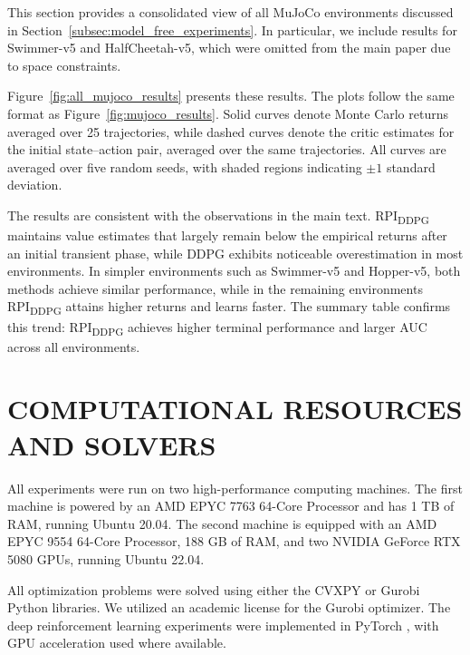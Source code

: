 \documentclass[twoside]{article}
\theoremstyle{plain}
\theoremstyle{definition}
\theoremstyle{remark}
\newcommand{\rpiddpg}{RPI\textsubscript{DDPG}}
\begin{document}
This section provides a consolidated view of all MuJoCo environments discussed in Section~\ref{subsec:model_free_experiments}. In particular, we include results for Swimmer-v5 and HalfCheetah-v5, which were omitted from the main paper due to space constraints.

Figure~\ref{fig:all_mujoco_results} presents these results. The plots follow the same format as Figure~\ref{fig:mujoco_results}. Solid curves denote Monte Carlo returns averaged over 25 trajectories, while dashed curves denote the critic estimates for the initial state–action pair, averaged over the same trajectories. All curves are averaged over five random seeds, with shaded regions indicating $\pm 1$ standard deviation.

The results are consistent with the observations in the main text. \rpiddpg{} maintains value estimates that largely remain below the empirical returns after an initial transient phase, while DDPG exhibits noticeable overestimation in most environments. In simpler environments such as Swimmer-v5 and Hopper-v5, both methods achieve similar performance, while in the remaining environments \rpiddpg{} attains higher returns and learns faster. The summary table confirms this trend: \rpiddpg{} achieves higher terminal performance and larger AUC across all environments.




\section{COMPUTATIONAL RESOURCES AND SOLVERS}
\label{sec:comp_res_solvers}
All experiments were run on two high-performance computing machines. The first machine is
powered by an AMD EPYC 7763 64-Core Processor and has 1 TB of RAM, running Ubuntu 20.04.
The second machine is equipped with an AMD EPYC 9554 64-Core Processor, 188 GB of RAM,
and two NVIDIA GeForce RTX 5080 GPUs, running Ubuntu 22.04.

All optimization problems were solved using either the CVXPY \citep{cvxpy1, cvxpy2} or Gurobi \citep{gurobi} Python libraries. We utilized an academic license for the Gurobi optimizer. 
The deep reinforcement learning experiments were implemented in PyTorch \citep{ansel2024pytorch}, with GPU acceleration used where available.
\end{document}
